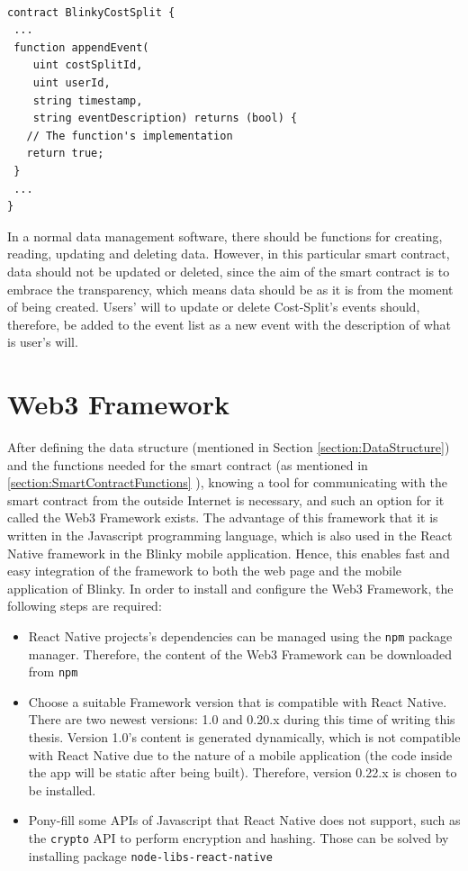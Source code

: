 \begin{lstlisting}[float,caption={Skeleton implementation of function \texttt{appendEvent}.},label={lst:appendEventFunction},language=Solidity]

contract BlinkyCostSplit {
 ...
 function appendEvent(
    uint costSplitId,
    uint userId,
    string timestamp,
    string eventDescription) returns (bool) {
   // The function's implementation
   return true;
 }
 ...
}

\end{lstlisting}

In a normal data management software, there should be functions for creating, reading, updating and deleting data. However, in this particular smart contract, data should not be updated or deleted, since the aim of the smart contract is to embrace the transparency, which means data should be as it is from the moment of being created. Users' will to update or delete Cost-Split's events should, therefore, be added to the event list as a new event with the description of what is user's will.

\section{Web3 Framework}

After defining the data structure (mentioned in Section \ref{section:DataStructure}) and the functions needed for the smart contract (as mentioned in \ref{section:SmartContractFunctions} ), knowing a tool for communicating with the smart contract from the outside Internet is necessary, and such an option for it called the Web3 Framework exists. The advantage of this framework that it is written in the Javascript programming language, which is also used in the React Native framework in the Blinky mobile application. Hence, this enables fast and easy integration of the framework to both the web page and the mobile application of Blinky. In order to install and configure the Web3 Framework, the following steps are required:

\begin{itemize}
    \item React Native projects's dependencies can be managed using the \texttt{npm} package manager. Therefore, the content of the Web3 Framework can be downloaded from \texttt{npm}
    \item Choose a suitable Framework version that is compatible with React Native. There are two newest versions: 1.0 and 0.20.x during this time of writing this thesis. Version 1.0's content is generated dynamically, which is not compatible with React Native due to the nature of a mobile application (the code inside the app will be static after being built). Therefore, version 0.22.x is chosen to be installed.
    \item Pony-fill some APIs of Javascript that React Native does not support, such as the \texttt{crypto} API to perform encryption and hashing. Those can be solved by installing package \texttt{node-libs-react-native}
\end{itemize}

